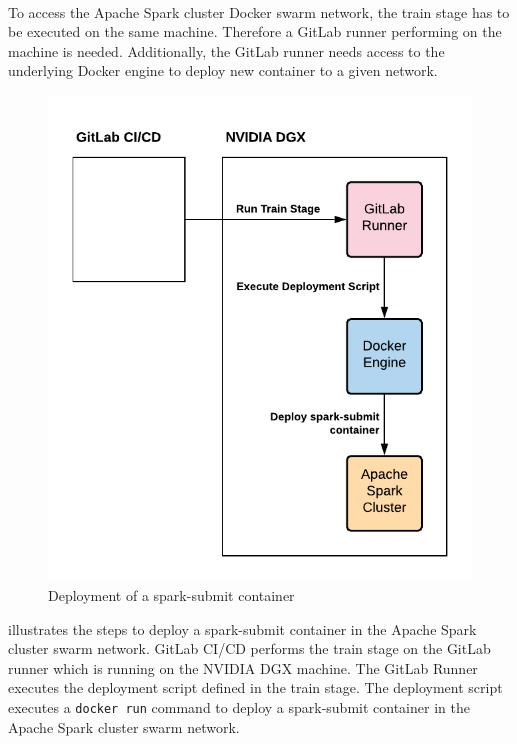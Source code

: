 \paragraph{}
To access the Apache Spark cluster Docker swarm network, the train stage has to be executed on the same machine.
Therefore a GitLab runner performing on the machine is needed. Additionally, the GitLab runner needs access to the underlying Docker engine to deploy new container to a given network.
\begin{figure}[h]
\centering
\includegraphics[scale=1]{images/05_conceptual_design/automated_deployment_pipeline/train_stage_runner}
\caption{Deployment of a spark-submit container}
\label{fig:05_deployment_train_concept}
\end{figure}
 illustrates the steps to deploy a spark-submit container in the Apache Spark cluster swarm network.
GitLab CI/CD performs the train stage on the GitLab runner which is running on the NVIDIA DGX machine.
The GitLab Runner executes the deployment script defined in the train stage.
The deployment script executes a \texttt{docker run} command to deploy a spark-submit container in the Apache Spark cluster swarm network.


